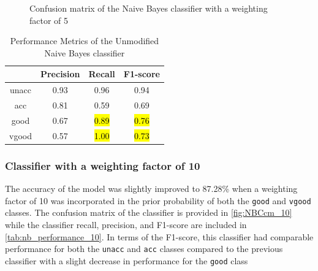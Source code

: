 \documentclass[a4paper]{article}
\begin{document}
\begin{figure} [h]
  \caption{Confusion matrix of the Naive Bayes classifier with a weighting factor of 5} 
  \label{fig:NBCcm_5}
\end{figure}

\begin{table}[ht]
  \centering
  \caption{Performance Metrics of the Unmodified Naive Bayes classifier}
  \label{tab:nb_performance_5}
  \begin{tabular}{||cccc||}
  \hline
  \textbf{ }    & \textbf{Precision}    & \textbf{Recall}   & \textbf{F1-score} \\
  \hline \hline
  unacc         & 0.93                  & 0.96              & 0.94\\ \hline
  acc           & 0.81                  & 0.59              & 0.69\\ \hline
  good          & 0.67                  & \hl{0.89}         & \hl{0.76}\\ \hline
  vgood         & 0.57                  & \hl{1.00}         & \hl{0.73}\\
  \hline
  \end{tabular}
\end{table}


\subsubsection{Classifier with a weighting factor of 10}
The accuracy of the model was slightly improved to 87.28\% when a weighting factor of 10 was incorporated in the prior probability of both the \lstinline{good} and \lstinline{vgood} classes. The confusion matrix of the classifier is provided in \autoref{fig:NBCcm_10} while the classifier recall, precision, and F1-score are included in \autoref{tab:nb_performance_10}. In terms of the F1-score, this classifier had comparable performance for both the \lstinline{unacc} and \lstinline{acc} classes compared to the previous classifier with a slight decrease in performance for the \lstinline{good} class
\end{document}
